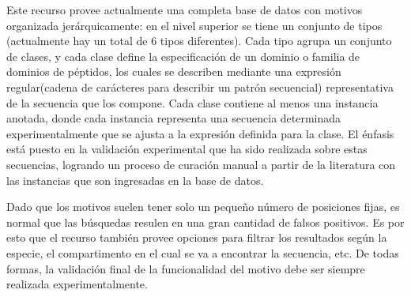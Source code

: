Este recurso provee actualmente una completa base de datos con motivos organizada jerárquicamente: en el nivel superior se tiene un conjunto de tipos (actualmente hay un total de 6 tipos diferentes). 
Cada tipo agrupa un conjunto de clases, y cada clase define la especificación de un dominio o familia de dominios de péptidos, 
los cuales se describen mediante una expresión regular(cadena de carácteres para describir un patrón secuencial\cite{regex}) representativa de la secuencia que los compone.
Cada clase contiene al menos una instancia anotada, donde cada instancia representa una secuencia determinada experimentalmente que se ajusta a la expresión definida para la clase.
El énfasis está puesto en la validación experimental que ha sido realizada sobre estas secuencias, logrando un proceso de curación manual a partir de la literatura con las instancias que son ingresadas en la base de datos.

Dado que los motivos suelen tener solo un pequeño número de posiciones fijas, es normal que las búsquedas resulen en una gran cantidad de falsos positivos.  
Es por esto que el recurso también provee opciones para filtrar los resultados según la especie, el compartimento en el cual se va a encontrar la secuencia, etc. 
De todas formas, la validación final de la funcionalidad del motivo debe ser siempre realizada experimentalmente.



